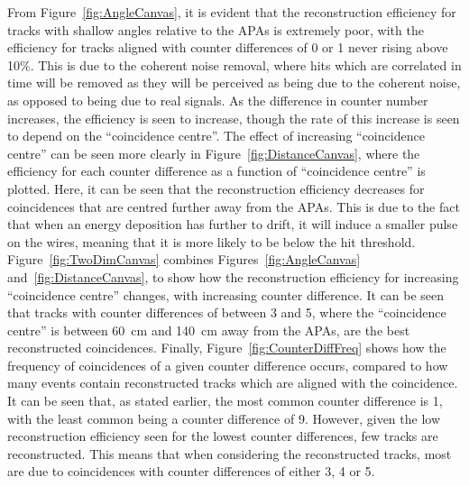 From Figure~\ref{fig:AngleCanvas}, it is evident that the reconstruction efficiency for tracks with shallow angles relative to the APAs is extremely poor, with the efficiency for tracks aligned with counter differences of 0 or 1 never rising above 10\%. This is due to the coherent noise removal, where hits which are correlated in time will be removed as they will be perceived as being due to the coherent noise, as opposed to being due to real signals. As the difference in counter number increases, the efficiency is seen to increase, though the rate of this increase is seen to depend on the ``coincidence centre''. The effect of increasing ``coincidence centre'' can be seen more clearly in Figure~\ref{fig:DistanceCanvas}, where the efficiency for each counter difference as a function of ``coincidence centre'' is plotted. Here, it can be seen that the reconstruction efficiency decreases for coincidences that are centred further away from the APAs. This is due to the fact that when an energy deposition has further to drift, it will induce a smaller pulse on the wires, meaning that it is more likely to be below the hit threshold. Figure~\ref{fig:TwoDimCanvas} combines Figures~\ref{fig:AngleCanvas} and~\ref{fig:DistanceCanvas}, to show how the reconstruction efficiency for increasing ``coincidence centre'' changes, with increasing counter difference. It can be seen that tracks with counter differences of between 3 and 5, where the ``coincidence centre'' is between 60~cm and 140~cm away from the APAs, are the best reconstructed coincidences. Finally, Figure~\ref{fig:CounterDiffFreq} shows how the frequency of coincidences of a given counter difference occurs, compared to how many events contain reconstructed tracks which are aligned with the coincidence. It can be seen that, as stated earlier, the most common counter difference is 1, with the least common being a counter difference of 9. However, given the low reconstruction efficiency seen for the lowest counter differences, few tracks are reconstructed. This means that when considering the reconstructed tracks, most are due to coincidences with counter differences of either 3, 4 or 5.

